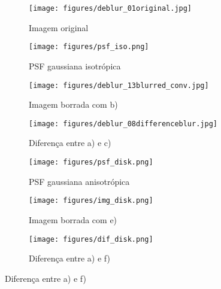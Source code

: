 \begin{figure}[H]
     \centering
     \begin{subfigure}[b]{0.32\textwidth}
         \centering
         \texttt{[image: figures/deblur\_01original.jpg]}
         \caption{Imagem original}
         \label{fig:01_002a}
     \end{subfigure}
     
     
     \begin{subfigure}[b]{0.32\textwidth}
         \centering
                  \texttt{[image: figures/psf\_iso.png]}
         \caption{PSF gaussiana isotrópica}
         \label{fig:01_002b}
     \end{subfigure}     
     \hfill
     \begin{subfigure}[b]{0.32\textwidth}
         \centering
                  \texttt{[image: figures/deblur\_13blurred\_conv.jpg]}
         \caption{Imagem borrada com b)}
         \label{fig:01_002c}
     \end{subfigure}
     \hfill
          \begin{subfigure}[b]{0.32\textwidth}
         \centering
                  \texttt{[image: figures/deblur\_08differenceblur.jpg]}
         \caption{Diferença entre a) e c)}
         \label{fig:01_002d}
     \end{subfigure}

     \begin{subfigure}[b]{0.32\textwidth}
         \centering
         \texttt{[image: figures/psf\_disk.png]}
         \caption{PSF gaussiana anisotrópica}
                  \label{fig:01_002e}
      \end{subfigure}
     \hfill
     \begin{subfigure}[b]{0.32\textwidth}
         \centering
                  \texttt{[image: figures/img\_disk.png]}
         \caption{Imagem borrada com e)}
                  \label{fig:01_002f}
       \end{subfigure}
     \hfill
          \begin{subfigure}[b]{0.32\textwidth}
         \centering
                  \texttt{[image: figures/dif\_disk.png]}
         \caption{Diferença entre a) e f)}
                  \label{fig:01_002g}
     \end{subfigure}


\end{figure}
